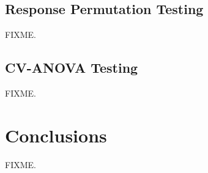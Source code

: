 \subsection{Response Permutation Testing}

\begin{doublespace}
FIXME.
\end{doublespace}

\subsection{CV-ANOVA Testing}

\begin{doublespace}
FIXME.
\end{doublespace}

\section{Conclusions}

\begin{doublespace}
FIXME.
\end{doublespace}





